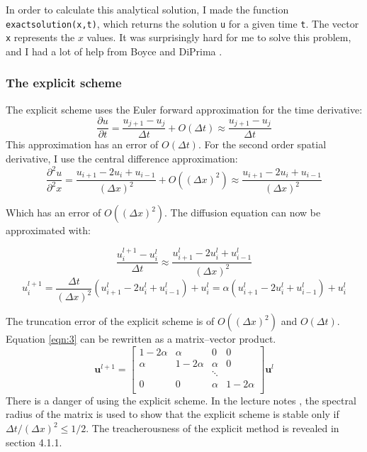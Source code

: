 \documentclass{article}
\begin{document}
In order to calculate this analytical solution, I made the function \texttt{exactsolution(x,t)}, which returns the solution \texttt{u} for a given time \texttt{t}. The vector \texttt{x} represents the $x$ values. It was surprisingly hard for me to solve this problem, and I had a lot of help from Boyce and DiPrima \cite{Boyce}.
\subsubsection{The explicit scheme}
The explicit scheme uses the Euler forward approximation for the time derivative:
\begin{equation*}
\frac{\partial u}{\partial t} = \frac{u_{j+1}-u_j}{\Delta t}+ O(\Delta t) \approx \frac{u_{j+1}-u_j}{\Delta t}
\end{equation*}
This approximation has an error of $O(\Delta t)$. For the second order spatial derivative, I use the central difference approximation:  
\begin{equation*}
\frac{\partial^2 u}{\partial^2 x} = \frac{u_{i+1}-2u_i + u_{i-1}}{(\Delta x)^2} + O((\Delta x)^2) \approx \frac{u_{i+1}-2u_i + u_{i-1}}{(\Delta x)^2}
\end{equation*}

Which has an error of $O((\Delta x)^2)$. The diffusion equation can now be approximated with:

\begin{equation*}
\frac{u_{i}^{l+1}-u_i^l}{\Delta t} \approx \frac{u_{i+1}^{l}-2u_i^{l} + u_{i-1}^l}{(\Delta x)^2}
\end{equation*}
\begin{equation}\label{eqn:3}
u_{i}^{l+1}= \frac{\Delta t}{(\Delta x)^2}(u_{i+1}^l-2u_{i}^l + u_{i-1}^{l})+u_{i}^{l}=\alpha(u_{i+1}^l-2u_{i}^l + u_{i-1}^{l})+u_{i}^{l}
\end{equation}

The truncation error of the explicit scheme is of $O((\Delta x)^2)$ and $O(\Delta t)$. Equation \ref{eqn:3} can be rewritten as a matrix--vector product.
\begin{equation*}
\bm{u}^{l+1}
=
\begin{bmatrix}
1-2\alpha & \alpha & 0 & 0 \\
\alpha & 1-2\alpha & \alpha & 0 \\
 &  & \ddots  &  \\
0 & 0 & \alpha & 1-2\alpha \\
\end{bmatrix}
\bm{u}^{l}
\end{equation*}
There is a danger of using the explicit scheme. In the lecture notes \cite{PDE}, the spectral radius of the matrix is used to show that the explicit scheme is stable only if $\Delta t / (\Delta x)^2 \leq 1/2$. The treacherousness of the explicit method is revealed in section 4.1.1. 
\end{document}
